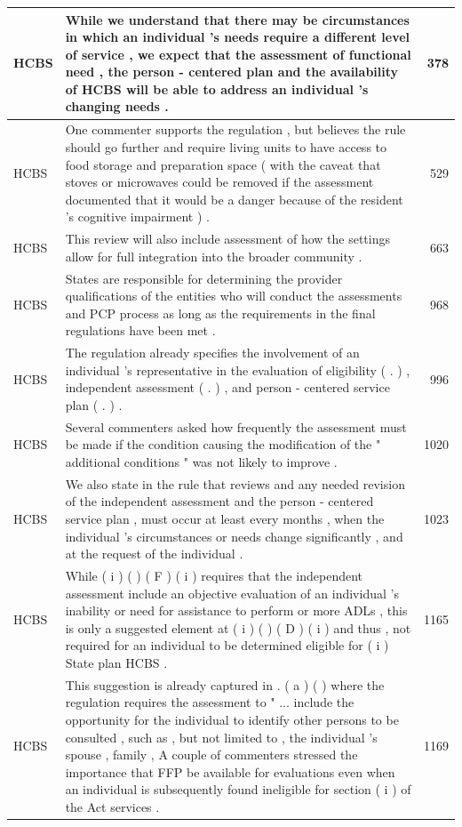 \documentclass[
]{book}
\begin{document}
\begin{tabular}{l|l|r}
\hline
HCBS & While we understand that there may be circumstances in which an individual 's needs require a different level of service , we expect that the assessment of functional need , the person - centered plan and the availability of HCBS will be able to address an individual 's changing needs . & 378\\
\hline
HCBS & One commenter supports the regulation , but believes the rule should go further and require living units to have access to food storage and preparation space ( with the caveat that stoves or microwaves could be removed if the assessment documented that it would be a danger because of the resident 's cognitive impairment ) . & 529\\
\hline
HCBS & This review will also include assessment of how the settings allow for full integration into the broader community . & 663\\
\hline
HCBS & States are responsible for determining the provider qualifications of the entities who will conduct the assessments and PCP process as long as the requirements in the final regulations have been met . & 968\\
\hline
HCBS & The regulation already specifies the involvement of an individual 's representative in the evaluation of eligibility ( . ) , independent assessment ( . ) , and person - centered service plan ( . ) . & 996\\
\hline
HCBS & Several commenters asked how frequently the assessment must be made if the condition causing the modification of the " additional conditions " was not likely to improve . & 1020\\
\hline
HCBS & We also state in the rule that reviews and any needed revision of the independent assessment and the person - centered service plan , must occur at least every months , when the individual 's circumstances or needs change significantly , and at the request of the individual . & 1023\\
\hline
HCBS & While ( i ) ( ) ( F ) ( i ) requires that the independent assessment include an objective evaluation of an individual 's inability or need for assistance to perform or more ADLs , this is only a suggested element at ( i ) ( ) ( D ) ( i ) and thus , not required for an individual to be determined eligible for ( i ) State plan HCBS . & 1165\\
\hline
HCBS & This suggestion is already captured in . ( a ) ( ) where the regulation requires the assessment to " ... include the opportunity for the individual to identify other persons to be consulted , such as , but not limited to , the individual 's spouse , family , A couple of commenters stressed the importance that FFP be available for evaluations even when an individual is subsequently found ineligible for section ( i ) of the Act services . & 1169\\

\end{tabular}
\end{document}
